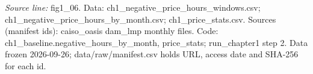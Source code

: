 {\scriptsize\textit{Source line:} fig1\_\allowbreak{}06. Data: ch1\_\allowbreak{}negative\_\allowbreak{}price\_\allowbreak{}hours\_\allowbreak{}windows.csv; ch1\_\allowbreak{}negative\_\allowbreak{}price\_\allowbreak{}hours\_\allowbreak{}by\_\allowbreak{}month.csv; ch1\_\allowbreak{}price\_\allowbreak{}stats.csv. Sources (manifest ids): caiso\_\allowbreak{}oasis dam\_\allowbreak{}lmp monthly files. Code: ch1\_\allowbreak{}baseline.negative\_\allowbreak{}hours\_\allowbreak{}by\_\allowbreak{}month, price\_\allowbreak{}stats; run\_\allowbreak{}chapter1 step 2. Data frozen 2026-09-26; data/raw/manifest.csv holds URL, access date and SHA-256 for each id.}